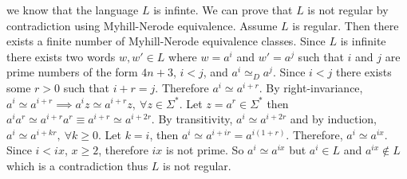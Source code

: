 \documentclass[12pt]{article}
\begin{document}
we know that the language $L$ is infinte. We can prove that $L$ is not regular
by contradiction using Myhill-Nerode equivalence. Assume $L$ is regular. Then
there exists a finite number of Myhill-Nerode equivalence classes. Since $L$ is
infinite there exists two words $w,w' \in L$ where $w = a^i$ and $w' = a^j$ such
that $i$ and $j$ are prime numbers of the form $4n+3$, $i <j$, and
$a^i \simeq_D a^j$.
Since $i < j$ there exists
some $r > 0$ such that $i + r  = j$. Therefore $a^i \simeq a^{i+r}$.
By right-invariance, $a^i \simeq a^{i+r} \implies a^{i}z \simeq a^{i+r}z,
\ \forall z \in \Sigma^*$. Let $z = a^r \in \Sigma^*$ then
$a^{i}a^{r} \simeq a^{i+r}a^{r} \equiv
a^{i+r} \simeq a^{i+2r}$. By transitivity, $a^i \simeq a^{i+2r}$ and by
induction, $a^i \simeq a^{i + kr},\ \forall k \ge 0$. Let $k = i$, then
$a^i \simeq a^{i+ir} = a^{i(1+r)}$. Therefore, $a^i \simeq a^{ix}$.
Since $i < ix$, $x \ge 2$, therefore $ix$ is not prime. So
$a^i \simeq a^{ix}$ but $a^i \in L$ and $a^{ix} \notin L$ which is a
contradiction thus $L$ is not regular.
\end{document}
